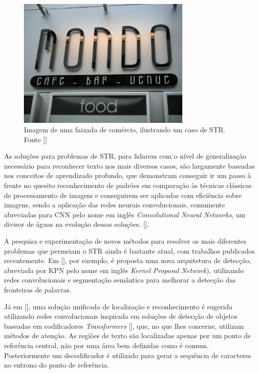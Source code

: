 \begin{figure}
    \centering
    \includegraphics[width=0.75\textwidth]{figs/img_139.jpg}
    \caption{Imagem de uma faixada de comércio, ilustrando um caso de STR. Fonte []}
    \label{fig:str-example}
\end{figure}

As soluções para problemas de STR, para lidarem com o nível de generalização necessário para reconhecer texto nos mais diversos casos, são largamente 
baseadas nos conceitos de aprendizado profundo, que demonstram conseguir ir um passo à frente no quesito reconhecimento de padrões em comparação às 
técnicas clássicas de processamento de imagem e conseguirem ser aplicadas com eficiência sobre imagens, sendo a aplicação das redes neurais convolucionais, 
comumente abreviadas para CNN pelo nome em inglês \textit{Convolutional Neural Networks}, um divisor de águas na evolução dessas soluções. 
[].

A pesquisa e experimentação de novos métodos para resolver os mais diferentes problemas que permeiam o STR ainda é bastante atual, com trabalhos 
publicados recentemente.
Em [], por exemplo, é proposta uma nova arquitetura de detecção, abreviada por KPN pelo nome em inglês \textit{Kernel Proposal Network}), 
utilizando redes convolucionais e segmentação semântica para melhorar a detecção das fronteiras de palavras.

Já em [], uma solução unificada de localização e reconhecimento é sugerida utilizando redes convolucionais inspirada em soluções de 
detecção de objetos baseadas em codificadores \textit{Transformers} [], que, no que lhes concerne, utilizam métodos de atenção. 
As regiões de texto são localizadas apenas por um ponto de referência central, não por uma área bem definidas como é comum. Posteriormente um decodificador 
é utilizado para gerar a sequência de caracteres no entrono do ponto de referência.

